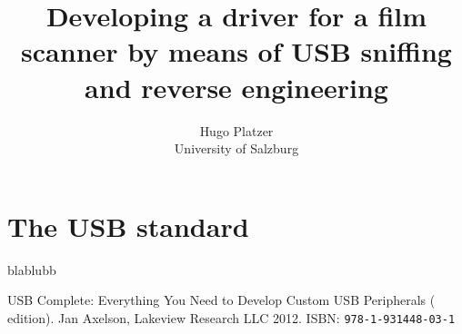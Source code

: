 \documentclass{article}
\begin{document}
\title{Developing a driver for a film scanner by means of USB sniffing and reverse engineering}
\author{Hugo Platzer \\ University of Salzburg}
\maketitle

\section{The USB standard}

blablubb

\begin{thebibliography}{}

USB Complete: Everything You Need to Develop Custom USB Peripherals ( edition).
Jan Axelson, Lakeview Research LLC 2012. ISBN: {\tt   978-1-931448-03-1}


\end{thebibliography}
\end{document}
